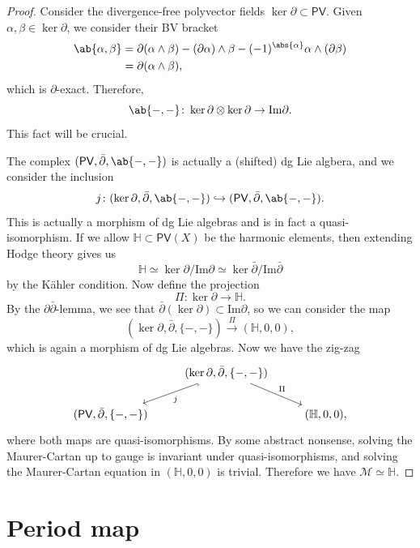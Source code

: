 \documentclass{amsart}
\theoremstyle{definition}
\theoremstyle{remark}
\theoremstyle{plain}
\theoremstyle{definition}
\theoremstyle{remark}
\newcommand{\Ima}{\mathrm{Im}}
\newcommand{\mc}[1]{\mathcal{#1}}
\newcommand{\ms}[1]{\mathsf{#1}}
\newcommand{\1}{\mathbf{1}}
\newcommand{\2}{\mathbf{2}}
\newcommand{\3}{\mathbf{3}}
\newcommand{\dbar}{\bar{\partial}}
\begin{document}
\begin{proof}
    Consider the divergence-free polyvector fields \(\ker \partial \subset \ms{PV}\). Given \(\alpha, \beta \in \ker \partial\), we consider their BV bracket
    \begin{align*}
        \ab\{\alpha, \beta\} &= \partial(\alpha \wedge \beta) - (\partial \alpha) \wedge \beta - (-1)^{\abs{\alpha}} \alpha \wedge (\partial \beta) \\
        &= \partial(\alpha \wedge \beta),
    \end{align*}
    which is \(\partial\)-exact. Therefore,
    \[ \ab\{-,-\} \colon \ker \partial \otimes \ker \partial \to \Ima \partial. \]
    This fact will be crucial.

    The complex \((\ms{PV}, \dbar, \ab\{-,-\})\) is actually a (shifted) dg Lie algbera, and we consider the inclusion
    \[ j \colon (\ker \partial, \dbar, \ab\{-,-\}) \hookrightarrow (\ms{PV}, \dbar, \ab\{-,-\}). \]
    This is actually a morphism of dg Lie algebras and is in fact a quasi-isomorphism. If we allow \(\mathbb{H} \subset \ms{PV}(X)\) be the harmonic elements, then extending Hodge theory gives us
    \[ \mathbb{H} \simeq \ker \partial / \Ima \partial \simeq \ker \dbar / \Ima \dbar \]
    by the Kähler condition. Now define the projection
    \[ \Pi \colon \ker \partial \to \mathbb{H}. \]
    By the \(\partial\dbar\)-lemma, we see that \(\dbar (\ker \partial) \subset \Ima \partial\), so we can consider the map
    \[ (\ker \partial, \dbar, \{-,-\}) \xrightarrow{\Pi} (\mathbb{H}, 0, 0), \]
    which is again a morphism of dg Lie algebras. Now we have the zig-zag
    \begin{equation*}
    \begin{tikzcd}
        & (\ker \partial, \dbar, \{-,-\}) \ar[hookrightarrow]{dl}{j} \ar{dr}{\Pi} \\
        (\ms{PV}, \dbar, \{-,-\}) & & (\mathbb{H}, 0, 0),
    \end{tikzcd}
    \end{equation*}
    where both maps are quasi-isomorphisms. By some abstract nonsense, solving the Maurer-Cartan up to gauge is invariant under quasi-isomorphisms, and solving the Maurer-Cartan equation in \((\mathbb{H}, 0, 0)\) is trivial. Therefore we have \(\mc{M} \simeq \mathbb{H}\).
\end{proof}



\section{Period map}%
\label{sec:Period map}
\end{document}
